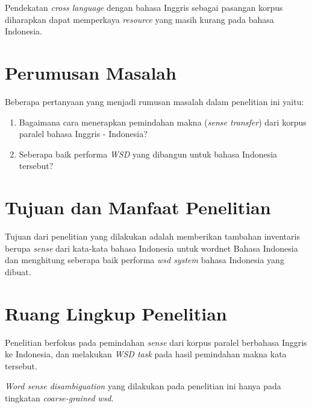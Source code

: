 Pendekatan \textit{cross language} dengan bahasa Inggris sebagai pasangan korpus diharapkan dapat memperkaya \textit{resource} yang masih kurang pada bahasa Indonesia. 
\section{Perumusan Masalah}
Beberapa pertanyaan yang menjadi rumusan masalah dalam penelitian ini yaitu:
\begin{enumerate}
	\item Bagaimana cara menerapkan pemindahan makna (\textit{sense transfer}) dari korpus paralel bahasa Inggris - Indonesia?
	\item Seberapa baik performa \textit{WSD} yang dibangun untuk bahasa Indonesia tersebut?
\end{enumerate}

\section{Tujuan dan Manfaat Penelitian}
Tujuan dari penelitian yang dilakukan adalah memberikan tambahan inventaris berupa \textit{sense} dari kata-kata bahasa Indonesia untuk wordnet Bahasa Indonesia dan menghitung seberapa baik performa \textit{wsd system} bahasa Indonesia yang dibuat.

\section{Ruang Lingkup Penelitian}
Penelitian berfokus pada pemindahan \textit{sense} dari korpus paralel berbahasa Inggris ke Indonesia, dan melakukan \textit{WSD task} pada hasil pemindahan makna kata tersebut.

\textit{Word sense disambiguation} yang dilakukan pada penelitian ini hanya pada tingkatan \textit{coarse-grained} \textit{wsd}.

